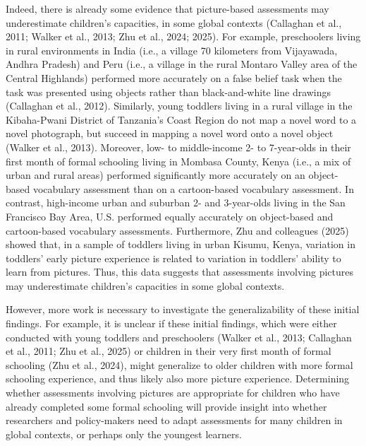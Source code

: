 \documentclass[10pt, letterpaper]{article}
\begin{document}
Indeed, there is already some evidence that picture-based assessments
may underestimate children's capacities, in some global contexts
(Callaghan et al., 2011; Walker et al., 2013; Zhu et al., 2024; 2025).
For example, preschoolers living in rural environments in India (i.e., a
village 70 kilometers from Vijayawada, Andhra Pradesh) and Peru (i.e., a
village in the rural Montaro Valley area of the Central Highlands)
performed more accurately on a false belief task when the task was
presented using objects rather than black-and-white line drawings
(Callaghan et al., 2012). Similarly, young toddlers living in a rural
village in the Kibaha-Pwani District of Tanzania's Coast Region do not
map a novel word to a novel photograph, but succeed in mapping a novel
word onto a novel object (Walker et al., 2013). Moreover, low- to
middle-income 2- to 7-year-olds in their first month of formal schooling
living in Mombasa County, Kenya (i.e., a mix of urban and rural areas)
performed significantly more accurately on an object-based vocabulary
assessment than on a cartoon-based vocabulary assessment. In contrast,
high-income urban and suburban 2- and 3-year-olds living in the San
Francisco Bay Area, U.S. performed equally accurately on object-based
and cartoon-based vocabulary assessments. Furthermore, Zhu and
colleagues (2025) showed that, in a sample of toddlers living in urban
Kisumu, Kenya, variation in toddlers' early picture experience is
related to variation in toddlers' ability to learn from pictures. Thus,
this data suggests that assessments involving pictures may underestimate
children's capacities in some global contexts.

However, more work is necessary to investigate the generalizability of
these initial findings. For example, it is unclear if these initial
findings, which were either conducted with young toddlers and
preschoolers (Walker et al., 2013; Callaghan et al., 2011; Zhu et al.,
2025) or children in their very first month of formal schooling (Zhu et
al., 2024), might generalize to older children with more formal
schooling experience, and thus likely also more picture experience.
Determining whether assessments involving pictures are appropriate for
children who have already completed some formal schooling will provide
insight into whether researchers and policy-makers need to adapt
assessments for many children in global contexts, or perhaps only the
youngest learners.
\end{document}
